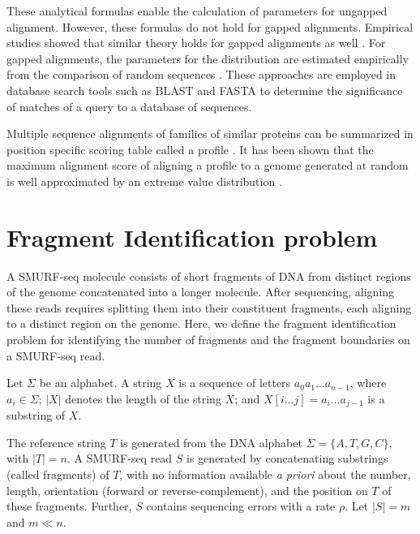 These analytical formulas enable the calculation of parameters for
ungapped alignment. However, these formulas do not hold for gapped
alignments. Empirical studies showed that similar theory holds for
gapped alignments as well
\citep{pearson1998empirical,smith1985statistical, altschul199627}.
%
For gapped alignments, the parameters for the distribution are estimated
empirically from the comparison of random sequences
\citep{waterman1994sequence,waterman1994rapid,altschul199627}.
These approaches are employed in database search tools such as BLAST
\citep{altschul1990basic,altschul1997gapped} and FASTA
\citep{pearson1988improved,pearson1995comparison} to determine the
significance of matches of a query to a database of sequences.

Multiple sequence alignments of families of similar proteins can be
summarized in position specific scoring table called a profile
\citep{gribskov1987profile}.  It has been shown that the maximum
alignment score of aligning a profile to a genome generated at random is
well approximated by an extreme value distribution
\citep{goldstein1994approximations}.



\section{Fragment Identification problem}
A SMURF-seq molecule consists of short fragments of DNA from distinct
regions of the genome concatenated into a longer molecule. After
sequencing, aligning these reads requires splitting them into their
constituent fragments, each aligning to a distinct region on the genome.
Here, we define the fragment identification problem for identifying the
number of fragments and the fragment boundaries on a SMURF-seq read.

Let $\Sigma$ be an alphabet. A string $X$ is a sequence of letters $a_0
a_1 \dots a_{n-1}$, where $a_i \in \Sigma$; $|X|$ denotes the length of
the string $X$; and $X[i \dots j] = a_i \dots a_{j-1}$ is a substring of
$X$.

The reference string $T$ is generated from the DNA alphabet $\Sigma =
\{A, T, G, C\}$, with $|T| = n$.
A SMURF-seq read $S$ is generated by concatenating substrings (called
fragments) of $T$, with no information available \emph{a priori} about
the number, length, orientation (forward or reverse-complement), and the
position on $T$ of these fragments.  Further, $S$ contains sequencing
errors with a rate $\rho$. Let $|S| = m$ and $m \ll n$.

